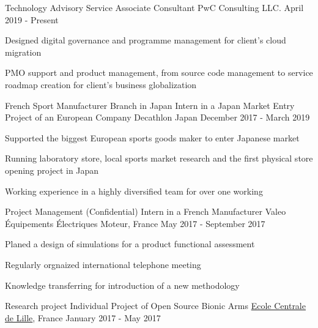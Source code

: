 \documentclass[12pt, a4paper]{cvncl}
\newcommand{\link}[2]{\href{#1}{#2}}
\begin{document}
\makecvheader

\begin{cventries}
  \cventry
    {Technology Advisory Service}
	{Associate Consultant}
    {PwC Consulting LLC.}
    {April 2019 - Present}
    {\begin{cvitems}
        \item{Designed digital governance and programme management for client's cloud migration}
        \item{PMO support and product management, from source code management to service roadmap creation for client's business globalization}
    \end{cvitems}}
  \cventry
    {French Sport Manufacturer Branch in Japan}
    {Intern in a Japan Market Entry Project of an European Company}
    {Decathlon Japan}
    {December 2017 - March 2019}
    {\begin{cvitems}
	\item{Supported the biggest European sports goods maker to enter Japanese market}
	\item{Running laboratory store, local sports market research and the first physical store opening project in Japan}
	\item{Working experience in a highly diversified team for over one working}
    \end{cvitems}}
  \cventry
    {Project Management (Confidential)}
	{Intern in a French Manufacturer}
    {Valeo \'Equipements \'Electriques Moteur, France}
    {May 2017 - September 2017}
    {\begin{cvitems}
        \item{Planed a design of simulations for a product functional assessment}
        \item{Regularly orgnaized international telephone meeting}
        \item{Knowledge transferring for introduction of a new methodology}
    \end{cvitems}}
  \cventry
    {Research project}
    {Individual Project of Open Source Bionic Arms}
    {\link{http://www.ec-lille.fr/en/index.html}{Ecole Centrale de Lille}, France}
    {January 2017 - May 2017}
    {\begin{cvitems}

\end{cvitems}}
\end{cventries}
\end{document}
